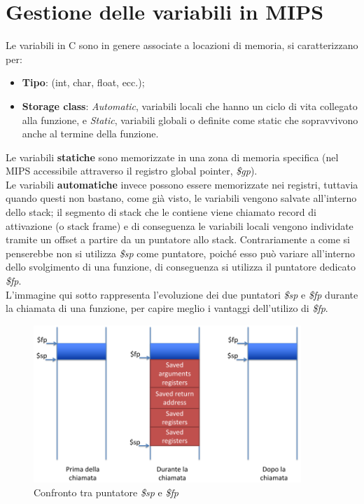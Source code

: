 \documentclass[class=book, crop=false]{standalone}
\begin{document}
\section{Gestione delle variabili in MIPS}
Le variabili in C sono in genere associate a locazioni di memoria, si caratterizzano per:
\begin{itemize}[noitemsep]
	\item \textbf{Tipo}: (int, char, float, ecc.);
	\item \textbf{Storage class}: \textit{Automatic}, variabili locali che hanno un ciclo di vita collegato alla funzione, e \textit{Static}, variabili globali o definite come static che sopravvivono anche al termine della funzione.
\end{itemize}
Le variabili \textbf{statiche} sono memorizzate in una zona di memoria specifica (nel MIPS accessibile attraverso il registro global pointer, \emph{\$gp}).\\
Le variabili \textbf{automatiche} invece possono essere memorizzate nei registri, tuttavia quando questi non bastano, come già visto, le variabili vengono salvate all'interno dello stack; il segmento di stack che le contiene viene chiamato record di attivazione (o stack frame) e di conseguenza le variabili locali vengono individate tramite un offset a partire da un puntatore allo stack.
Contrariamente a come si penserebbe non si utilizza \emph{\$sp} come puntatore, poiché esso può variare all'interno dello svolgimento di una funzione, di conseguenza si utilizza il puntatore dedicato \emph{\$fp}.\\
L'immagine qui sotto rappresenta l'evoluzione dei due puntatori \emph{\$sp} e \emph{\$fp} durante la chiamata di una funzione, per capire meglio i vantaggi dell'utilizo di \emph{\$fp}.
\begin{figure}[H]
	\centering
	\includegraphics[width=0.9\textwidth,keepaspectratio]{sp-vs-fp}
	\caption{Confronto tra puntatore \emph{\$sp} e \emph{\$fp}}
\end{figure}
\end{document}
